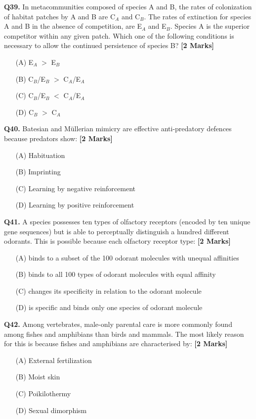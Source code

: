 \documentclass[11pt]{article}
\newcommand{\questionb}[2]{
    \noindent\textbf{Q#2.} #1 \hfill \textbf{[2 Marks]}
}
\begin{document}
\questionb{In metacommunities composed of species A and B, the rates of colonization of habitat patches by A and B are C$_A$ and C$_B$. The rates of extinction for species A and B in the absence of competition, are E$_A$ and E$_B$. Species A is the superior competitor within any given patch. Which one of the following conditions is necessary to allow the continued persistence of species B?}{39}
\begin{enumerate}
    \item[(A)] E$_A$ $>$ E$_B$  
    \item[(B)] C$_B$/E$_B$ $>$ C$_A$/E$_A$  
    \item[(C)] C$_B$/E$_B$ $<$ C$_A$/E$_A$  
    \item[(D)] C$_B$ $>$ C$_A$  
\end{enumerate}
\vspace{0.5cm}

\questionb{Batesian and Müllerian mimicry are effective anti-predatory defences because predators show:}{40}
\begin{enumerate}
    \item[(A)] Habituation  
    \item[(B)] Imprinting  
    \item[(C)] Learning by negative reinforcement  
    \item[(D)] Learning by positive reinforcement  
\end{enumerate}
\vspace{0.5cm}

\questionb{A species possesses ten types of olfactory receptors (encoded by ten unique gene sequences) but is able to perceptually distinguish a hundred different odorants. This is possible because each olfactory receptor type:}{41}
\begin{enumerate}
    \item[(A)] binds to a subset of the 100 odorant molecules with unequal affinities  
    \item[(B)] binds to all 100 types of odorant molecules with equal affinity  
    \item[(C)] changes its specificity in relation to the odorant molecule  
    \item[(D)] is specific and binds only one species of odorant molecule  
\end{enumerate}
\vspace{0.5cm}

\questionb{Among vertebrates, male-only parental care is more commonly found among fishes and amphibians than birds and mammals. The most likely reason for this is because fishes and amphibians are characterised by:}{42}
\begin{enumerate}
    \item[(A)] External fertilization  
    \item[(B)] Moist skin  
    \item[(C)] Poikilothermy  
    \item[(D)] Sexual dimorphism  
\end{enumerate}
\vspace{0.5cm}
\end{document}
